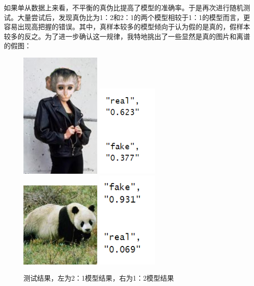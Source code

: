 \documentclass[boldfont,linespread=1.35]{ctexart}
\begin{document}
如果单从数据上来看，不平衡的真伪比提高了模型的准确率。于是再次进行随机测试。大量尝试后，发现真伪比为1：2和2：1的两个模型相较于1：1的模型而言，更容易出现高把握的错误。其中，真样本较多的模型倾向于认为假的是真的，假样本较多的反之。为了进一步确认这一规律，我特地挑出了一些显然是真的图片和离谱的假图：
\begin{figure}[h]
	\centering
	{\includegraphics[width=4cm]{111}}
	{\includegraphics[width=3cm]{112}}
	{\includegraphics[width=4cm]{113}}
	{\includegraphics[width=3cm]{114}}
	\hspace{0in}
	\color{gray}\caption{测试结果，左为2：1模型结果，右为1：2模型结果}
\end{figure}
\end{document}
